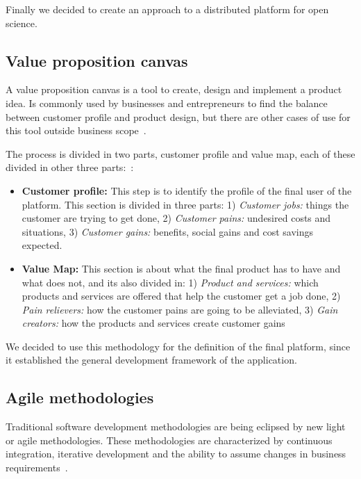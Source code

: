 Finally we decided to create an approach to a distributed platform for open
science.

\subsection{Value proposition canvas}


A value proposition canvas is a tool to create, design and implement a product
idea. Is commonly used by businesses and entrepreneurs to find the balance
between customer profile and product design, but there are other cases of use
for this tool outside business
scope~\cite{pokorna2015value,meertens2012mapping}.

The process is divided in two parts, customer profile and value map, each of
these divided in other three parts:~\cite{osterwalder2014value}:

\begin{itemize}
\item \textbf{Customer profile:} This step is to identify the profile of the
  final user of the platform. This section is divided in three parts: 1)
  \emph{Customer jobs:} things the customer are trying to get done, 2)
  \emph{Customer pains:} undesired costs and situations, 3) \emph{Customer
    gains:} benefits, social gains and cost savings expected.
\item \textbf{Value Map:} This section is about what the final product has to
  have and what does not, and its also divided in: 1) \emph{Product and
    services:} which products and services are offered that help the customer
  get a job done, 2) \emph{Pain relievers:} how the customer pains are going to
  be alleviated, 3) \emph{Gain creators:} how the products and services create
  customer gains
\end{itemize}

We decided to use this methodology for the definition of the final platform,
since it established the general development framework of the application.

\subsection{Agile methodologies}
Traditional software development methodologies are being eclipsed by new light
or agile methodologies. These methodologies are characterized by continuous
integration, iterative development and the ability to assume changes in business
requirements~\cite{boehm2005management,livermore2008factors}.

